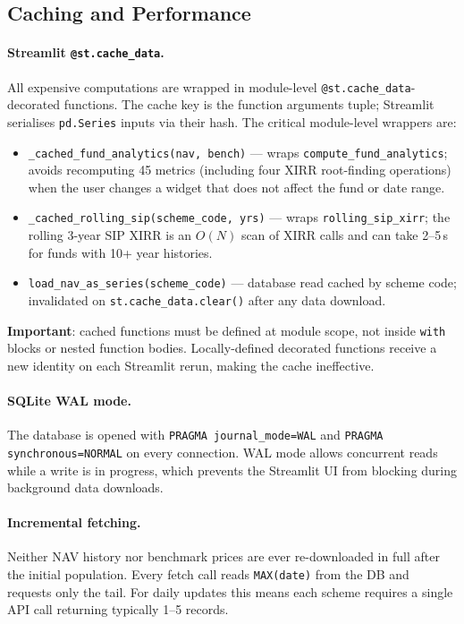 \documentclass[12pt, a4paper]{article}
\begin{document}
\subsection{Caching and Performance}

\paragraph{Streamlit \texttt{@st.cache\_data}.}
All expensive computations are wrapped in module-level
\texttt{@st.cache\_data}-decorated functions.  The cache key is the function
arguments tuple; Streamlit serialises \texttt{pd.Series} inputs via their
hash.  The critical module-level wrappers are:

\begin{itemize}[noitemsep]
  \item \texttt{\_cached\_fund\_analytics(nav, bench)} — wraps
    \texttt{compute\_fund\_analytics}; avoids recomputing 45 metrics
    (including four XIRR root-finding operations) when the user changes a
    widget that does not affect the fund or date range.
  \item \texttt{\_cached\_rolling\_sip(scheme\_code, yrs)} — wraps
    \texttt{rolling\_sip\_xirr}; the rolling 3-year SIP XIRR is an $O(N)$
    scan of XIRR calls and can take 2--5\,s for funds with 10+ year histories.
  \item \texttt{load\_nav\_as\_series(scheme\_code)} — database read cached by
    scheme code; invalidated on \texttt{st.cache\_data.clear()} after any
    data download.
\end{itemize}

\textbf{Important}: cached functions must be defined at module scope, not
inside \texttt{with} blocks or nested function bodies.  Locally-defined
decorated functions receive a new identity on each Streamlit rerun, making
the cache ineffective.

\paragraph{SQLite WAL mode.}
The database is opened with \texttt{PRAGMA journal\_mode=WAL} and
\texttt{PRAGMA synchronous=NORMAL} on every connection.  WAL mode allows
concurrent reads while a write is in progress, which prevents the Streamlit UI
from blocking during background data downloads.

\paragraph{Incremental fetching.}
Neither NAV history nor benchmark prices are ever re-downloaded in full after
the initial population.  Every fetch call reads \texttt{MAX(date)} from the DB
and requests only the tail.  For daily updates this means each scheme requires
a single API call returning typically 1--5 records.
\end{document}
